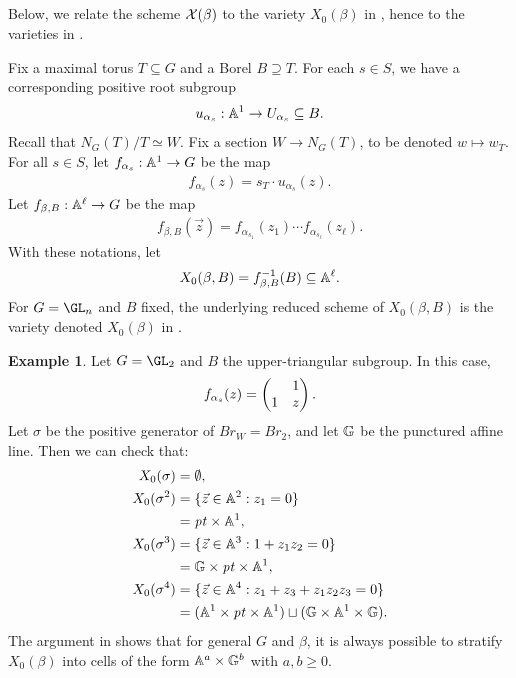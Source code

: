 \documentclass[a4paper,10pt,leqno]{amsart}
\theoremstyle{plain}
\theoremstyle{plain}
\theoremstyle{plain}
\theoremstyle{definition}
\newtheorem{ex}[thm]{Example}
\theoremstyle{remark}
\newcommand{\Br}{\mathit{Br}}
\newcommand{\point}{\mathit{pt}}
\begin{document}
\subsection{}

Below, we relate the scheme $\cal{X}(\beta)$ to the variety $X_0(\beta)$ in \cite{mellit}, hence to the varieties in \cite{cggs}.

Fix a maximal torus $T \subseteq G$ and a Borel $B \supseteq T$.
For each $s \in S$, we have a corresponding positive root subgroup
\begin{align}
u_{\alpha_s} : \bb{A}^1 \to U_{\alpha_s} \subseteq B.
\end{align}
Recall that $N_G(T)/T \simeq W$.
Fix a section $W \to N_G(T)$, to be denoted $w \mapsto w_T$.
For all $s \in S$, let $f_{\alpha_s} : \bb{A}^1 \to G$ be the map
\begin{align}
f_{\alpha_s}(z) = s_T \cdot u_{\alpha_s}(z).
\end{align}
Let $f_{\beta, B} : \bb{A}^\ell \to G$ be the map
\begin{align}
f_{\beta, B}(\vec{z}) = f_{\alpha_{s_1}}(z_1) \cdots f_{\alpha_{s_\ell}}(z_\ell).
\end{align}
With these notations, let 
\begin{equation}
X_0(\beta, B) = f_{\beta, B}^{-1}(B) \subseteq \bb{A}^\ell.
\end{equation}
For $G = \GL_n$ and $B$ fixed, the underlying reduced scheme of $X_0(\beta, B)$ is the variety denoted $X_0(\beta)$ in \cite[\S{5.3}]{mellit}.

\begin{ex}
Let $G = \GL_2$ and $B$ the upper-triangular subgroup.
In this case,
\begin{align}
f_{\alpha_s}(z) = \pmat{&1\\ 1&z}.
\end{align}
Let $\sigma$ be the positive generator of $\Br_W = \Br_2$, and let $\bb{G}$ be the punctured affine line.
Then we can check that:
\begin{align}
X_0(\sigma) &= \emptyset,\\
X_0(\sigma^2)
	&= \{\vec{z} \in \bb{A}^2 : z_1 = 0\} \\
	&= \point \times \bb{A}^1,\nonumber\\ 
X_0(\sigma^3) 
	&= \{\vec{z} \in \bb{A}^3 : 1 + z_1z_2 = 0\}\\
	& = \bb{G} \times \point \times \bb{A}^1,\nonumber\\
X_0(\sigma^4) 
	&= \{\vec{z} \in \bb{A}^4 : z_1 + z_3 + z_1z_2z_3 = 0\} \\
	&= (\bb{A}^1 \times \point \times \bb{A}^1) \sqcup (\bb{G} \times \bb{A}^1 \times \bb{G}). \nonumber
\end{align}
The argument in \cite[\S{5.4}]{mellit} shows that for general $G$ and $\beta$, it is always possible to stratify $X_0(\beta)$ into cells of the form $\bb{A}^a \times \bb{G}^b$ with $a, b \geq 0$.
\end{ex}
\end{document}
